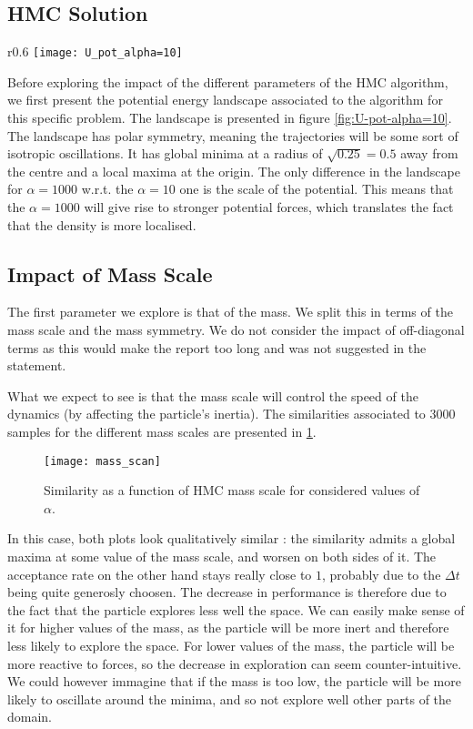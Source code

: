 \documentclass[a4paper, 12pt,oneside]{article}
\begin{document}
		\subsection{HMC Solution}
			\begin{wrapfigure}[18]{r}{0.6\textwidth}
				\centering
					\vspace{-2em}
					\texttt{[image: U\_pot\_alpha=10]}
					\caption{Potential energy landscape associated to HMC algorithm for $\alpha=10$. Version for $\alpha=1000$ is identical, except scales are multiplied by a factor 100.}
					\label{fig:U-pot-alpha=10}
			\end{wrapfigure}
			Before exploring the impact of the different parameters of the HMC algorithm, we first present the potential energy landscape associated to the algorithm for this specific problem. The landscape is presented in figure \ref{fig:U-pot-alpha=10}. 
			The landscape has polar symmetry, meaning the trajectories will be some sort of isotropic oscillations. It has global minima at a radius of $\sqrt{0.25}=0.5$ away from the centre and a local maxima at the origin. The only difference in the landscape for $\alpha=1000$ w.r.t. the $\alpha=10$ one is the scale of the potential. This means that the $\alpha=1000$ will give rise to stronger potential forces, which translates the fact that the density is more localised. 
			\subsection{Impact of Mass Scale}
			The first parameter we explore is that of the mass. We split this in terms of the mass scale and the mass symmetry. We do not consider the impact of off-diagonal terms as this would make the report too long and was not suggested in the statement. 

			What we expect to see is that the mass scale will control the speed of the dynamics (by affecting the particle's inertia).
			The similarities associated to 3000 samples for the different mass scales are presented in \ref{fig:mass-scan}.
			\begin{figure}[htb]
				\centering
					\vspace{0em}
					\texttt{[image: mass\_scan]}
					\caption{Similarity as a function of HMC mass scale for considered values of $\alpha$.}
					\label{fig:mass-scan}
			\end{figure}
			In this case, both plots look qualitatively similar : the similarity admits a global maxima at some value of the mass scale, and worsen on both sides of it. The acceptance rate on the other hand stays really close to $1$, probably due to the $\Delta t$ being quite generosly choosen. The decrease in performance is therefore due to the fact that the particle explores less well the space. We can easily make sense of it for higher values of the mass, as the particle will be more inert and therefore less likely to explore the space. For lower values of the mass, the particle will be more reactive to forces, so the decrease in exploration can seem counter-intuitive. We could however immagine that if the mass is too low, the particle will be more likely to oscillate around the minima, and so not explore well other parts of the domain.
			
\end{document}
